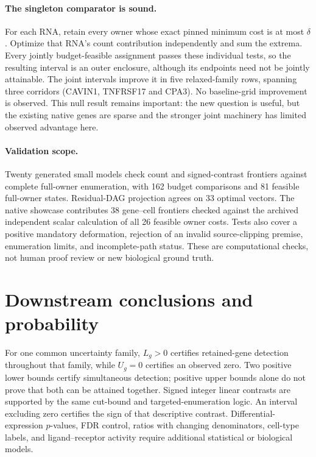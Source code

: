 \documentclass[11pt,letterpaper]{article}
\begin{document}
\paragraph{The singleton comparator is sound.}
For each RNA, retain every owner whose exact pinned minimum cost is at most $\delta$. Optimize that RNA's count contribution independently and sum the extrema. Every jointly budget-feasible assignment passes these individual tests, so the resulting interval is an outer enclosure, although its endpoints need not be jointly attainable. The joint intervals improve it in five relaxed-family rows, spanning three corridors (CAVIN1, TNFRSF17 and CPA3). No baseline-grid improvement is observed. This null result remains important: the new question is useful, but the existing native genes are sparse and the stronger joint machinery has limited observed advantage here.

\paragraph{Validation scope.}
Twenty generated small models check count and signed-contrast frontiers against complete full-owner enumeration, with 162 budget comparisons and 81 feasible full-owner states. Residual-DAG projection agrees on 33 optimal vectors. The native showcase contributes 38 gene--cell frontiers checked against the archived independent scalar calculation of all 26 feasible owner costs. Tests also cover a positive mandatory deformation, rejection of an invalid source-clipping premise, enumeration limits, and incomplete-path status. These are computational checks, not human proof review or new biological ground truth.

\section{Downstream conclusions and probability}
For one common uncertainty family, $L_g>0$ certifies retained-gene detection throughout that family, while $U_g=0$ certifies an observed zero. Two positive lower bounds certify simultaneous detection; positive upper bounds alone do not prove that both can be attained together. Signed integer linear contrasts are supported by the same cut-bound and targeted-enumeration logic. An interval excluding zero certifies the sign of that descriptive contrast. Differential-expression $p$-values, FDR control, ratios with changing denominators, cell-type labels, and ligand--receptor activity require additional statistical or biological models.
\end{document}
